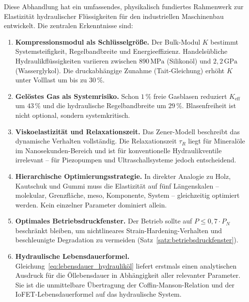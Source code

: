 ﻿\documentclass[a4paper,12pt]{scrreprt}
\theoremstyle{definition}
\begin{document}
Diese Abhandlung hat ein umfassendes, physikalisch fundiertes Rahmenwerk
zur Elastizität hydraulischer Flüssigkeiten für den industriellen
Maschinenbau entwickelt. Die zentralen Erkenntnisse sind:

\begin{enumerate}
  \item \textbf{Kompressionsmodul als Schlüsselgröße.}
    Der Bulk-Modul $K$ bestimmt Systemsteifigkeit, Regelbandbreite und
    Energieeffizienz. Handelsübliche Hydraulikflüssigkeiten variieren
    zwischen $890\,\mathrm{MPa}$ (Silikonöl) und $2{,}2\,\mathrm{GPa}$
    (Wasserglykol). Die druckabhängige Zunahme (Tait-Gleichung) erhöht
    $K$ unter Volllast um bis zu $30\,\%$.

  \item \textbf{Gelöstes Gas als Systemrisiko.}
    Schon $1\,\%$ freie Gasblasen reduziert $K_{\mathrm{eff}}$ um $43\,\%$
    und die hydraulische Regelbandbreite um $29\,\%$. Blasenfreiheit ist
    nicht optional, sondern systemkritisch.

  \item \textbf{Viskoelastizität und Relaxationszeit.}
    Das Zener-Modell beschreibt das dynamische Verhalten vollständig.
    Die Relaxationszeit $\tau_R$ liegt für Mineralöle im Nanosekunden-Bereich
    und ist für konventionelle Hydraulikventile irrelevant -- für
    Piezopumpen und Ultraschallsysteme jedoch entscheidend.

  \item \textbf{Hierarchische Optimierungsstrategie.}
    In direkter Analogie zu Holz, Kautschuk und Gummi muss die Elastizität
    auf fünf Längenskalen -- molekular, Grenzfläche, meso, Komponente,
    System -- gleichzeitig optimiert werden. Kein einzelner Parameter
    dominiert allein.

  \item \textbf{Optimales Betriebsdruckfenster.}
    Der Betrieb sollte auf $P \leq 0{,}7 \cdot P_N$ beschränkt bleiben,
    um nichtlineares Strain-Hardening-Verhalten und beschleunigte
    Degradation zu vermeiden (Satz~\ref{satz:betriebsdruckfenster}).

  \item \textbf{Hydraulische Lebensdauerformel.}
    Gleichung~\eqref{eq:lebensdauer_hydrauliköl} liefert erstmals einen
    analytischen Ausdruck für die Öllebensdauer in Abhängigkeit aller
    relevanter Parameter. Sie ist die unmittelbare Übertragung der
    Coffin-Manson-Relation und der IoFET-Lebensdauerformel auf das
    hydraulische System.


\end{enumerate}
\end{document}
